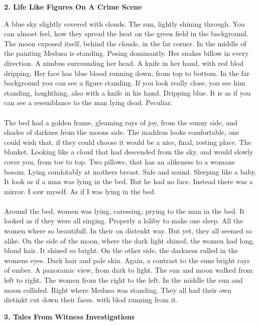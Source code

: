 \documentclass[]{article}
\begin{document}
\newpage

\begin{center}
	\large\textbf{2. Life Like Figures On A Crime Scene}
\end{center}

A blue sky slightly covered with clouds. The sun, lightly shining through. You can almost feel, how they spread the heat on the green field in the background. The moon exposed itself, behind the clouds, in the far corner. In the middle of the painting Medusa is standing. Posing dominantly. Her snakes billow in every direction. A nimbus surrounding her head. A knife in her hand, with red blod dripping. Her face has blue blood running down, from top to bottom. In the far background you can see a figure standing. If you look really close, you see him standing, laughthing, also with a knife in his hand. Dripping blue. It is as if you can see a resemblance to the man lying dead. Peculiar.
\\ \\
The bed had a golden frame, gleaming rays of joy, from the sunny side, and shades of darknes from the moons side. The maddras looks  comfortable, one could wish that, if they could choose it would be a nice, final, resting place. The blanket. Looking like a cloud that had descended from the sky, and would slowly cover you, from toe to top. Two pillows, that has an alikeness to a womans bosom. Lying comfotably at mothers breast. Safe and sound. Sleeping like a baby. It look as if a man was lying in the bed. But he had no face. Instead there was a mirror. I saw myself. As if I was lying in the bed.
\\ \\
Around the bed, women was lying, caressing, prying to the man in the bed. It looked as if they were all singing. Properly a loliby to make one sleep. All the women where so beautifull. In their on distenkt way. But yet, they all seemed so alike. On the side of the moon, where the dark light shined, the women had long, blond hair. It shined so bright. On the other side, the darkness rulled in the womens eyes. Dark hair and pale skin. Again, a contrast to the suns bright rays of ember. A panoramic view, from dark to light. The sun and moon walked from left to right. The women from the right to the left. In the middle the sun and moon collided. Right where Medusa was standing. They all had their own distinkt cut down their faces. with blod running from it. 

\newpage

\begin{center}
	\large\textbf{3. Tales From Witness Investigations}
\end{center}
\end{document}
